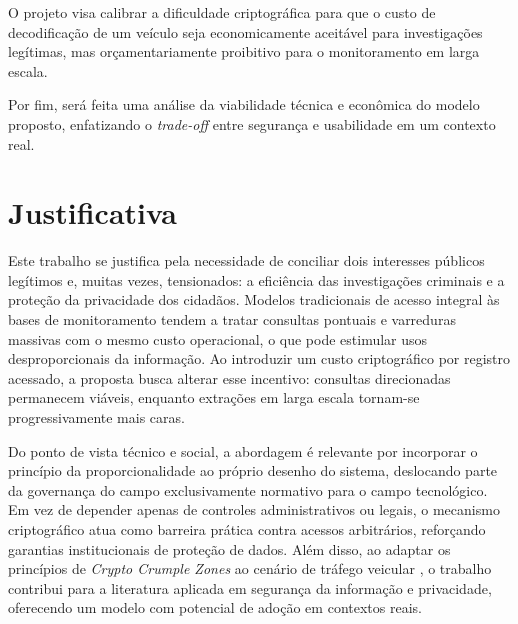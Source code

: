 O projeto visa calibrar a dificuldade criptográfica para que o custo de decodificação de um veículo seja economicamente aceitável para investigações legítimas, mas orçamentariamente proibitivo para o monitoramento em larga escala.

Por fim, será feita uma análise da viabilidade técnica e econômica do modelo proposto, enfatizando o \textit{trade-off} entre segurança e usabilidade em um contexto real.
\section{Justificativa}
Este trabalho se justifica pela necessidade de conciliar dois interesses públicos legítimos e, muitas vezes, tensionados: a eficiência das investigações criminais e a proteção da privacidade dos cidadãos. Modelos tradicionais de acesso integral às bases de monitoramento tendem a tratar consultas pontuais e varreduras massivas com o mesmo custo operacional, o que pode estimular usos desproporcionais da informação. Ao introduzir um custo criptográfico por registro acessado, a proposta busca alterar esse incentivo: consultas direcionadas permanecem viáveis, enquanto extrações em larga escala tornam-se progressivamente mais caras.

Do ponto de vista técnico e social, a abordagem é relevante por incorporar o princípio da proporcionalidade ao próprio desenho do sistema, deslocando parte da governança do campo exclusivamente normativo para o campo tecnológico. Em vez de depender apenas de controles administrativos ou legais, o mecanismo criptográfico atua como barreira prática contra acessos arbitrários, reforçando garantias institucionais de proteção de dados. Além disso, ao adaptar os princípios de \textit{Crypto Crumple Zones} ao cenário de tráfego veicular \cite{wright2018}, o trabalho contribui para a literatura aplicada em segurança da informação e privacidade, oferecendo um modelo com potencial de adoção em contextos reais.


